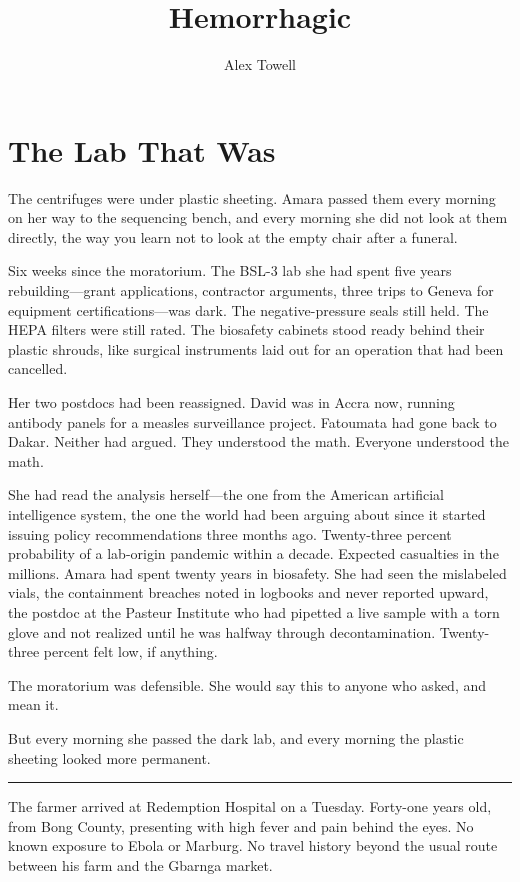 \documentclass[11pt]{article}
\title{\textbf{Hemorrhagic}}
\author{Alex Towell}
\date{}
\begin{document}
\maketitle
\thispagestyle{empty}

\section*{The Lab That Was}

The centrifuges were under plastic sheeting. Amara passed them every morning on her way to the sequencing bench, and every morning she did not look at them directly, the way you learn not to look at the empty chair after a funeral.

Six weeks since the moratorium. The BSL-3 lab she had spent five years rebuilding---grant applications, contractor arguments, three trips to Geneva for equipment certifications---was dark. The negative-pressure seals still held. The HEPA filters were still rated. The biosafety cabinets stood ready behind their plastic shrouds, like surgical instruments laid out for an operation that had been cancelled.

Her two postdocs had been reassigned. David was in Accra now, running antibody panels for a measles surveillance project. Fatoumata had gone back to Dakar. Neither had argued. They understood the math. Everyone understood the math.

She had read the analysis herself---the one from the American artificial intelligence system, the one the world had been arguing about since it started issuing policy recommendations three months ago. Twenty-three percent probability of a lab-origin pandemic within a decade. Expected casualties in the millions. Amara had spent twenty years in biosafety. She had seen the mislabeled vials, the containment breaches noted in logbooks and never reported upward, the postdoc at the Pasteur Institute who had pipetted a live sample with a torn glove and not realized until he was halfway through decontamination. Twenty-three percent felt low, if anything.

The moratorium was defensible. She would say this to anyone who asked, and mean it.

But every morning she passed the dark lab, and every morning the plastic sheeting looked more permanent.

\begin{center}\rule{0.3\linewidth}{0.4pt}\end{center}

The farmer arrived at Redemption Hospital on a Tuesday. Forty-one years old, from Bong County, presenting with high fever and pain behind the eyes. No known exposure to Ebola or Marburg. No travel history beyond the usual route between his farm and the Gbarnga market.
\end{document}
